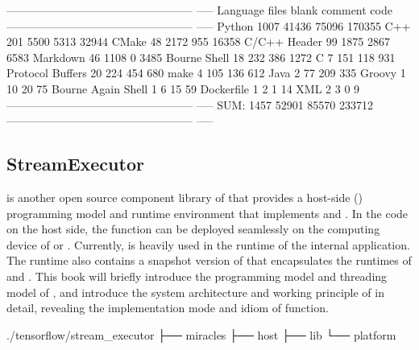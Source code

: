 \begin{content}
\begin{leftbar}
\begin{python}[caption={ContribCode Statistics}]
-------------------------------------------------- -----
Language            files     blank   comment      code
-------------------------------------------------- -----
Python               1007     41436     75096    170355
C++                   201      5500      5313     32944
CMake                  48      2172       955     16358
C/C++ Header           99      1875      2867      6583
Markdown 46 1108 0 3485
Bourne Shell           18       232       386      1272
C                       7       151       118       931
Protocol Buffers       20       224       454       680
make                    4       105       136       612
Java                    2        77       209       335
Groovy                  1        10        20        75
Bourne Again Shell      1         6        15        59
Dockerfile              1         2         1        14
XML                     2         3         0         9
-------------------------------------------------- -----
SUM:                 1457     52901     85570    233712
-------------------------------------------------- -----
\end{python}
\end{leftbar}


\subsection{StreamExecutor}
 is another open source component library of  that provides a host-side () programming model and runtime environment that implements  and . In the code on the host side, the  function can be deployed seamlessly on the computing device of  or .
Currently,  is heavily used in the runtime of the  internal application. The \tf{} runtime also contains a snapshot version of  that encapsulates the runtimes of  and . This book will briefly introduce the programming model and threading model of , and introduce the system architecture and working principle of  in detail, revealing the implementation mode and idiom of  function.

\begin{leftbar}
\begin{c++}[caption={StreamExecutorSource Structure}]
./tensorflow/stream_executor
├── miracles
├── host
├── lib
└── platform
\end{c++}
\end{leftbar}


\end{content}
